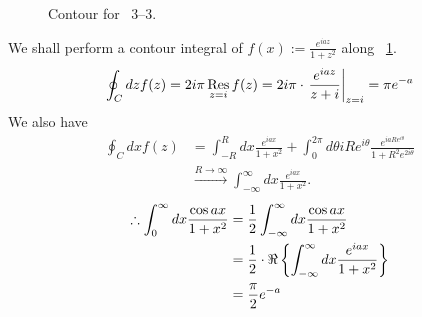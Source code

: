 \item

\begin{figure}[h]
	\centering
	\caption{Contour for ~3--3.}%
	\label{fig:problem3-3}
\end{figure}

We shall perform a contour integral of $f(x) := \frac{e^{iaz}}{1 + z^2}$ along ~\ref{fig:problem3-3}.
\[
	\oint_C dz f(z)
	= 2i\pi \mathop{\mathrm{Res}}_{z = i} f(z)
	= 2i\pi \cdot {\left. \frac{e^{iaz}}{z + i} \right|}_{z = i}
	= \pi e^{-a}
\]
We also have
\begin{align*}
	\oint_C dx f(z)
	&= \int_{-R}^{R} dx \frac{e^{iax}}{1 + x^2}
	 +\int_0^{2\pi} d\theta iRe^{i\theta} \frac{e^{iaRe^{i\theta}}}{1 + R^2 e^{2i\theta}} \\
	& \xrightarrow{R \rightarrow \infty} \int_{-\infty}^{\infty} dx \frac{e^{iax}}{1 + x^2}.
\end{align*}
\begin{align*}
	\therefore \int_{0}^{\infty} dx \frac{\cos ax}{1 + x^2}
	&= \frac{1}{2} \int_{-\infty}^{\infty} dx \frac{\cos ax}{1 + x^2} \\
	&= \frac{1}{2} \cdot \Re \left\{ \int_{-\infty}^{\infty} dx \frac{e^{iax}}{1 + x^2} \right\} \\
	&= \frac{\pi}{2} e^{-a}
\end{align*}